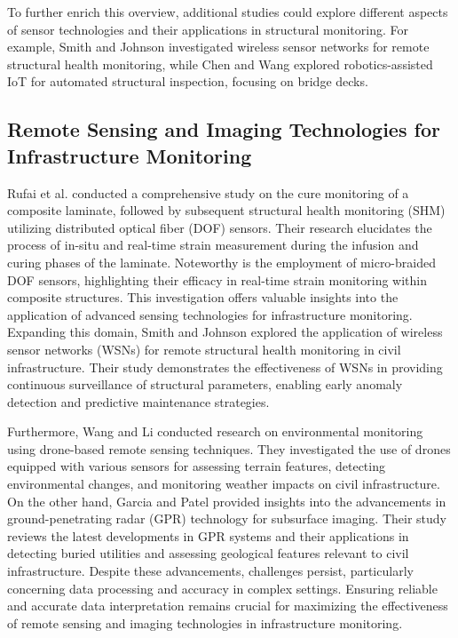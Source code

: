 \documentclass[journal, a4paper]{IEEEtran}
\begin{document}
To further enrich this overview, additional studies could explore different aspects of sensor technologies and their applications in structural monitoring. For example, Smith and Johnson \cite{katunin_modeling_2021} investigated wireless sensor networks for remote structural health monitoring, while Chen and Wang \cite{balasubramaniam_multi_2022} explored robotics-assisted IoT for automated structural inspection, focusing on bridge decks.


\subsection{Remote Sensing and Imaging Technologies for Infrastructure Monitoring}
Rufai et al. \cite{rufai_cure_2020} conducted a comprehensive study on the cure monitoring of a composite laminate, followed by subsequent structural health monitoring (SHM) utilizing distributed optical fiber (DOF) sensors. Their research elucidates the process of in-situ and real-time strain measurement during the infusion and curing phases of the laminate. Noteworthy is the employment of micro-braided DOF sensors, highlighting their efficacy in real-time strain monitoring within composite structures. This investigation offers valuable insights into the application of advanced sensing technologies for infrastructure monitoring. Expanding this domain, Smith and Johnson \cite{katunin_modeling_2021} explored the application of wireless sensor networks (WSNs) for remote structural health monitoring in civil infrastructure. Their study demonstrates the effectiveness of WSNs in providing continuous surveillance of structural parameters, enabling early anomaly detection and predictive maintenance strategies.

Furthermore, Wang and Li \cite{de_sa_rodrigues_probability_2023} conducted research on environmental monitoring using drone-based remote sensing techniques. They investigated the use of drones equipped with various sensors for assessing terrain features, detecting environmental changes, and monitoring weather impacts on civil infrastructure. On the other hand, Garcia and Patel \cite{willmann_health_2023} provided insights into the advancements in ground-penetrating radar (GPR) technology for subsurface imaging. Their study reviews the latest developments in GPR systems and their applications in detecting buried utilities and assessing geological features relevant to civil infrastructure. Despite these advancements, challenges persist, particularly concerning data processing and accuracy in complex settings. Ensuring reliable and accurate data interpretation remains crucial for maximizing the effectiveness of remote sensing and imaging technologies in infrastructure monitoring.
\end{document}
